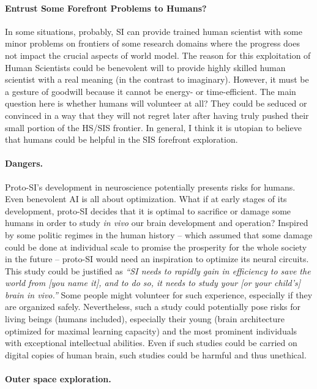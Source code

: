 \documentclass[a4paper,11pt]{article}
\begin{document}
\paragraph{Entrust Some Forefront Problems to Humans?}

In some situations, probably, SI can provide trained human scientist with some minor problems on frontiers of some research domains where the progress does not impact the crucial aspects of world model. The reason for this exploitation of Human Scientists could be benevolent will to provide highly skilled human scientist with a real meaning (in the contrast to imaginary). However, it must be a gesture of goodwill because it cannot be  energy- or time-efficient. The main question here is whether humans will volunteer at all? They could be seduced or convinced in a way that they will not regret later after having truly pushed their small portion of the HS/SIS frontier. In general, I think it is utopian to believe that humans could be helpful in the SIS forefront exploration. 

\paragraph{Dangers.} 

Proto-SI's development in neuroscience potentially presents risks for humans. Even benevolent AI is all about optimization. What if at early stages of its development, proto-SI decides that it is optimal to sacrifice or damage some humans in order to study \emph{in vivo} our brain development and operation? Inspired by some politic regimes in the human history -- which assumed that some damage could be done at individual scale to promise the prosperity for the whole society in the future -- proto-SI would need an inspiration to optimize its neural circuits. This study could be justified as \textit{``SI needs to rapidly gain in efficiency to save the world from [you name it], and to do so, it needs to study your [or your child's] brain in vivo.''} 
Some people might volunteer for such experience, especially if they are organized safely.
Nevertheless, such a study could potentially pose risks for living beings (humans included), especially their young (brain architecture optimized for maximal learning capacity) and the most prominent individuals with exceptional intellectual abilities. Even if such studies could be carried on digital copies of human brain, such studies could be harmful and thus unethical.

\paragraph{Outer space exploration.}
\end{document}
